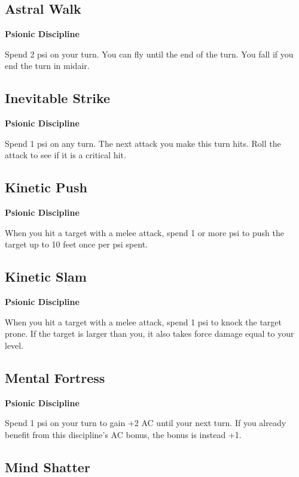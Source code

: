 \documentclass[12pt,letterpaper,twocolumn,openany,nodeprecatedcode,bg=none]{dndbook}
\begin{document}
\subsection{Astral Walk}\label{astral-walk}

\textbf{Psionic Discipline}

Spend 2 psi on your turn. You can fly until the end of the turn. You
fall if you end the turn in midair.

\subsection{Inevitable Strike}\label{inevitable-strike}

\textbf{Psionic Discipline}

Spend 1 psi on any turn. The next attack you make this turn hits. Roll
the attack to see if it is a critical hit.

\subsection{Kinetic Push}\label{kinetic-push}

\textbf{Psionic Discipline}

When you hit a target with a melee attack, spend 1 or more psi to push
the target up to 10 feet once per psi spent.

\subsection{Kinetic Slam}\label{kinetic-slam}

\textbf{Psionic Discipline}

When you hit a target with a melee attack, spend 1 psi to knock the
target prone. If the target is larger than you, it also takes force
damage equal to your level.

\subsection{Mental Fortress}\label{mental-fortress}

\textbf{Psionic Discipline}

Spend 1 psi on your turn to gain +2 AC until your next turn. If you
already benefit from this discipline's AC bonus, the bonus is instead
+1.

\subsection{Mind Shatter}\label{mind-shatter}
\end{document}
